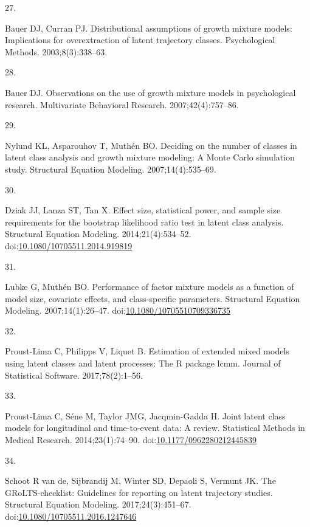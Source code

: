 \documentclass[
  11pt,
]{article}
\newlength{\cslhangindent}
\newlength{\csllabelwidth}
\newenvironment{CSLReferences}[2] %
 {\begin{list}{}{%
  \setlength{\itemindent}{0pt}
  \setlength{\leftmargin}{0pt}
  \setlength{\parsep}{0pt}
  \ifodd #1
   \setlength{\leftmargin}{\cslhangindent}
   \setlength{\itemindent}{-1\cslhangindent}
  \fi
  \setlength{\itemsep}{#2\baselineskip}}}
 {\end{list}}
\newcommand{\CSLLeftMargin}[1]{\parbox[t]{\csllabelwidth}{\strut#1\strut}}
\newcommand{\CSLRightInline}[1]{\parbox[t]{\linewidth - \csllabelwidth}{\strut#1\strut}}
\begin{document}
\begin{CSLReferences}{0}{1}
\CSLLeftMargin{27. }%
\CSLRightInline{Bauer DJ, Curran PJ. Distributional assumptions of growth mixture models: Implications for overextraction of latent trajectory classes. Psychological Methods. 2003;8(3):338--63.}

\CSLLeftMargin{28. }%
\CSLRightInline{Bauer DJ. Observations on the use of growth mixture models in psychological research. Multivariate Behavioral Research. 2007;42(4):757--86.}

\CSLLeftMargin{29. }%
\CSLRightInline{Nylund KL, Asparouhov T, Muthén BO. Deciding on the number of classes in latent class analysis and growth mixture modeling: A {M}onte {C}arlo simulation study. Structural Equation Modeling. 2007;14(4):535--69.}

\CSLLeftMargin{30. }%
\CSLRightInline{Dziak JJ, Lanza ST, Tan X. Effect size, statistical power, and sample size requirements for the bootstrap likelihood ratio test in latent class analysis. Structural Equation Modeling. 2014;21(4):534--52. doi:\href{https://doi.org/10.1080/10705511.2014.919819}{10.1080/10705511.2014.919819}}

\CSLLeftMargin{31. }%
\CSLRightInline{Lubke G, Muthén BO. Performance of factor mixture models as a function of model size, covariate effects, and class-specific parameters. Structural Equation Modeling. 2007;14(1):26--47. doi:\href{https://doi.org/10.1080/10705510709336735}{10.1080/10705510709336735}}

\CSLLeftMargin{32. }%
\CSLRightInline{Proust-Lima C, Philipps V, Liquet B. Estimation of extended mixed models using latent classes and latent processes: The {R} package lcmm. Journal of Statistical Software. 2017;78(2):1--56.}

\CSLLeftMargin{33. }%
\CSLRightInline{Proust-Lima C, Séne M, Taylor JMG, Jacqmin-Gadda H. Joint latent class models for longitudinal and time-to-event data: A review. Statistical Methods in Medical Research. 2014;23(1):74--90. doi:\href{https://doi.org/10.1177/0962280212445839}{10.1177/0962280212445839}}

\CSLLeftMargin{34. }%
\CSLRightInline{Schoot R van de, Sijbrandij M, Winter SD, Depaoli S, Vermunt JK. The {GRoLTS}-checklist: Guidelines for reporting on latent trajectory studies. Structural Equation Modeling. 2017;24(3):451--67. doi:\href{https://doi.org/10.1080/10705511.2016.1247646}{10.1080/10705511.2016.1247646}}


\end{CSLReferences}
\end{document}
